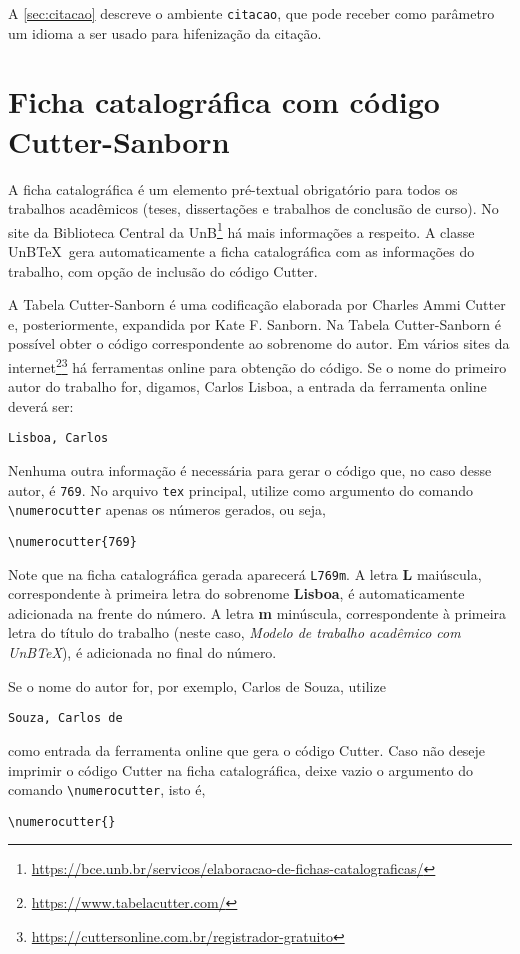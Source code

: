 A \cref{sec:citacao} descreve o ambiente \texttt{citacao}, que pode receber como parâmetro um idioma a ser usado para hifenização da citação.

\section{Ficha catalográfica com código Cutter-Sanborn}

A ficha catalográfica é um elemento pré-textual obrigatório para todos os trabalhos acadêmicos (teses, dissertações e trabalhos de conclusão de curso). No site da Biblioteca Central da UnB\footnote{\url{https://bce.unb.br/servicos/elaboracao-de-fichas-catalograficas/}} há mais informações a respeito. A classe UnB\TeX\ gera automaticamente a ficha catalográfica com as informações do trabalho, com opção de inclusão do código Cutter.

A Tabela Cutter-Sanborn é uma codificação elaborada por Charles Ammi Cutter e, posteriormente, expandida por Kate F. Sanborn. Na Tabela Cutter-Sanborn é possível obter o código correspondente ao sobrenome do autor. Em vários sites da internet\footnote{\url{https://www.tabelacutter.com/}}\footnote{\url{https://cuttersonline.com.br/registrador-gratuito}} há ferramentas online para obtenção do código. Se o nome do primeiro autor do trabalho for, digamos, Carlos Lisboa, a entrada da ferramenta online deverá ser: 
\begin{verbatim}
Lisboa, Carlos
\end{verbatim}
Nenhuma outra informação é necessária para gerar o código que, no caso desse autor, é \texttt{769}. No arquivo \texttt{tex} principal, utilize como argumento do comando \verb|\numerocutter| apenas os números gerados, ou seja,
\begin{verbatim}
\numerocutter{769}
\end{verbatim}
Note que na ficha catalográfica gerada aparecerá \texttt{L769m}. A letra \textbf{L} maiúscula, correspondente à primeira letra do sobrenome \textbf{Lisboa}, é automaticamente adicionada na frente do número. A letra \textbf{m} minúscula, correspondente à primeira letra do título do trabalho (neste caso, \emph{Modelo de trabalho acadêmico com UnB\TeX}), é adicionada no final do número.

Se o nome do autor for, por exemplo, Carlos de Souza, utilize 
\begin{verbatim}
Souza, Carlos de
\end{verbatim}
como entrada da ferramenta online que gera o código Cutter. Caso não deseje imprimir o código Cutter na ficha catalográfica, deixe vazio o argumento do comando \verb|\numerocutter|, isto é,
\begin{verbatim}
\numerocutter{}
\end{verbatim}

